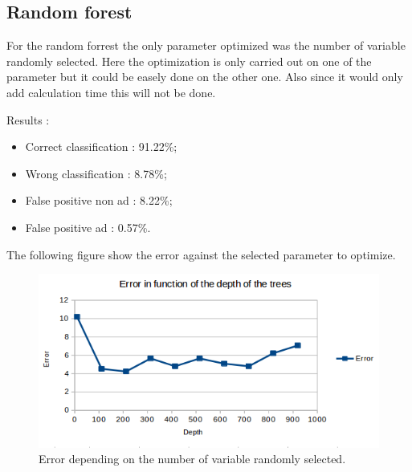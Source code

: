 \subsection{Random forest}

For the random forrest the only parameter optimized was the number of variable randomly selected. Here the optimization is only carried out on one of the parameter but it could be easely done on the other one. Also since it would only add calculation time this will not be done.

Results :
\begin{itemize}
  \item Correct classification : 91.22\%;
  \item Wrong classification : 8.78\%;
  \item False positive non ad : 8.22\%;
  \item False positive ad : 0.57\%.
\end{itemize}

The following figure show the error against the selected parameter to optimize.

\begin{figure}[h]
 \centering
 \includegraphics[scale=0.5]{../data/images/RFPO.png}
 \caption{Error depending on the number of variable randomly selected.}
\end{figure}
